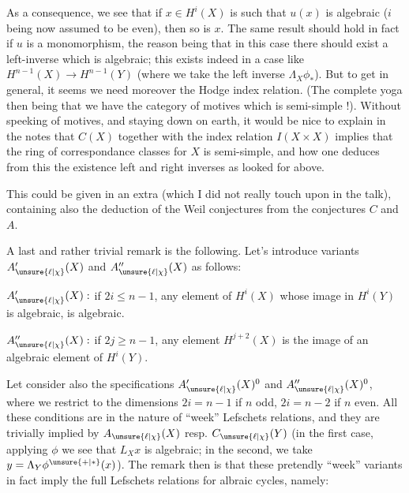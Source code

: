 As a consequence, we see that if $x\in H^i(X)$ is such that $u(x)$ is algebraic ($i$ being now assumed to be even), then so is $x$. The same result should hold in fact if $u$ is a monomorphism, the reason being that in this case there should exist a left-inverse which is algebraic; this exists indeed in a case like $H^{n-1}(X)\to H^{n-1}(Y)$ (where we take the left inverse $\Lambda_X\phi_*$). But to get  in general, it seems we need moreover the Hodge index relation. (The complete yoga then being that we have the category of motives which is semi-simple !). Without speeking of motives, and staying down on earth, it would be nice to explain in the notes that $C(X)$ together with the index relation $I(X\times X)$ implies that the ring of correspondance classes for $X$ is semi-simple, and how one deduces from this the existence  left and right inverses as looked for above.



This could be given in an extra  (which I did not really touch upon in the talk), containing also the deduction of the Weil conjectures from the conjectures $C$ and $A$.

A last and rather trivial remark is the following. Let's introduce  variants $A'_{\unsure{\ell|\chi}}(X)$ and $A''_{\unsure{\ell|\chi}}(X)$ as follows:

$A'_{\unsure{\ell|\chi}}(X):$ if $2i\leq n-1$, any element  of $H^i(X)$ whose image in $H^i(Y)$ is algebraic, is algebraic.

$A''_{\unsure{\ell|\chi}}(X):$ if $2j\geq n-1$, any  element   $H^{j+2}(X)$ is  the image of an algebraic element of $H^i(Y)$.

Let  consider also the specifications $A'_{\unsure{\ell|\chi}}(X)^0$ and $A''_{\unsure{\ell|\chi}}(X)^0$, where we restrict to the  dimensions $2i=n-1$ if $n$ odd, $2i=n-2$ if $n$ even. All these conditions are in the nature of ``week'' Lefschets relations, and they are trivially implied by $A_{\unsure{\ell|\chi}}(X)$ resp. $C_{\unsure{\ell|\chi}}(Y)$ (in the first case, applying $\phi$ we see that $L_Xx$ is algebraic; in the second, we take $y=\Lambda_Y\phi^{\unsure{+|*}}(x)$). The remark then is that these pretendly ``week'' variants in fact imply the full Lefschets relations for albraic cycles, namely:

